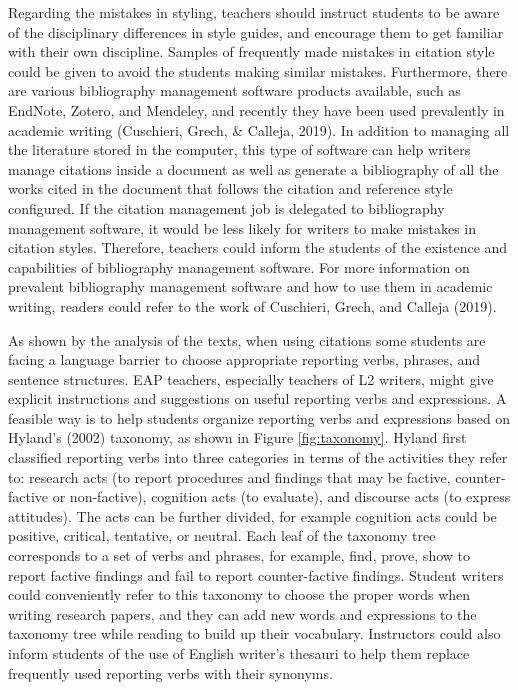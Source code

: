 Regarding the mistakes in styling, teachers should instruct students to be aware of the disciplinary differences in style guides, and encourage them to get familiar with their own discipline. Samples of frequently made mistakes in citation style could be given to avoid the students making similar mistakes. Furthermore, there are various bibliography management software products available, such as EndNote, Zotero, and Mendeley, and recently they have been used prevalently in academic writing (Cuschieri, Grech, \& Calleja, 2019). In addition to managing all the literature stored in the computer, this type of software can help writers manage citations inside a document as well as generate a bibliography of all the works cited in the document that follows the citation and reference style configured. If the citation management job is delegated to bibliography management software, it would be less likely for writers to make mistakes in citation styles. Therefore, teachers could inform the students of the existence and capabilities of bibliography management software. For more information on prevalent bibliography management software and how to use them in academic writing, readers could refer to the work of Cuschieri, Grech, and Calleja (2019).

As shown by the analysis of the texts, when using citations some students are facing a language barrier to choose appropriate reporting verbs, phrases, and sentence structures. EAP teachers, especially teachers of L2 writers, might give explicit instructions and suggestions on useful reporting verbs and expressions. A feasible way is to help students organize reporting verbs and expressions based on Hyland’s (2002) taxonomy, as shown in Figure \ref{fig:taxonomy}. Hyland first classified reporting verbs into three categories in terms of the activities they refer to: research acts (to report procedures and findings that may be factive, counter-factive or non-factive), cognition acts (to evaluate), and discourse acts (to express attitudes). The acts can be further divided, for example cognition acts could be positive, critical, tentative, or neutral. Each leaf of the taxonomy tree corresponds to a set of verbs and phrases, for example, find, prove, show to report factive findings and fail to report counter-factive findings. Student writers could conveniently refer to this taxonomy to choose the proper words when writing research papers, and they can add new words and expressions to the taxonomy tree while reading to build up their vocabulary. Instructors could also inform students of the use of English writer’s thesauri to help them replace frequently used reporting verbs with their synonyms.

